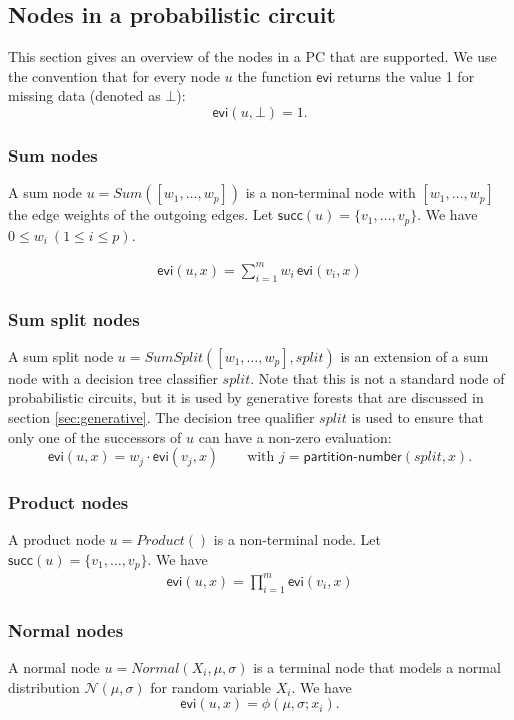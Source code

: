 \documentclass{article}
\newcommand{\func}[1]{\ensuremath{\textsf{#1}}} %
\newcommand{\obj}[1]{\ensuremath{\textit{#1}}} %
\newcommand{\set}[1]{\ensuremath{\{ #1 \} }} %
\begin{document}
\subsection{Nodes in a probabilistic circuit}
This section gives an overview of the nodes in a PC that are supported. We use the convention that for every node $u$ the function \func{evi} returns the value 1 for missing data (denoted as $\bot$):
\[
\func{evi}(u,\bot) = 1.
\]

\subsubsection*{Sum nodes}
A sum node $u = \obj{Sum}([w_1, \ldots, w_p])$ is a non-terminal node with $[w_1, \ldots, w_p]$ the edge weights of the outgoing edges. Let $\func{succ}(u) = \{ v_1, \ldots, v_p \}$. We have $0 \leq w_i ~ (1 \leq i \leq p)$.

\[
\begin{array}{ll}
\func{evi}(u, x) = \sum\limits_{i=1}^m w_i \, \func{evi}(v_i, x)
\end{array}
\]

\subsubsection*{Sum split nodes}
A sum split node $u = \obj{SumSplit}([w_1, \ldots, w_p], \obj{split})$ is an extension of a sum node with a decision tree classifier $\obj{split}$. Note that this is not a standard node of probabilistic circuits, but it is used by generative forests that are discussed in section \ref{sec:generative}.
The decision tree qualifier $\obj{split}$ is used to ensure that only one of the successors of $u$ can have a non-zero evaluation:
\[
\func{evi}(u, x) = w_j \cdot \func{evi}(v_j, x) \qquad \text{with } j=\func{partition-number}(split, x).
\]

\subsubsection*{Product nodes}
A product node $u = \obj{Product}()$ is a non-terminal node. Let $\func{succ}(u) = \{ v_1, \ldots, v_p \}$. We have
\[
\begin{array}{ll}
\func{evi}(u, x) = \prod\limits_{i=1}^m \func{evi}(v_i, x)
\end{array}
\]

\subsubsection*{Normal nodes}
A normal node $u = \obj{Normal}(X_i, \mu, \sigma)$ is a terminal node that models a normal distribution $\mathcal{N}(\mu,\sigma)$ for random variable $X_i$.
We have
\[
\func{evi}(u, x) = \phi(\mu,\sigma; x_i).
\]
\end{document}
